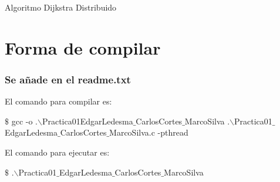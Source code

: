\documentclass[a4paper,12pt]{article}
\begin{document}

\newpage



\newpage

\begin{center}
    {\Large Algoritmo Dijkstra Distribuido}
\end{center}

\section*{Forma de compilar}
\subsubsection*{Se añade en el readme.txt}

El comando para compilar es:
\begin{center}
    $\$$ gcc -o .$\backslash$Practica01EdgarLedesma$\_$CarlosCortes$\_$MarcoSilva .$\backslash$Practica01$\_$EdgarLedesma$\_$CarlosCortes$\_$MarcoSilva.c -pthread
\end{center}

El comando para ejecutar es:

\begin{center}
    $\$$ .$\backslash$Practica01$\_$EdgarLedesma$\_$CarlosCortes$\_$MarcoSilva
\end{center}
\end{document}
